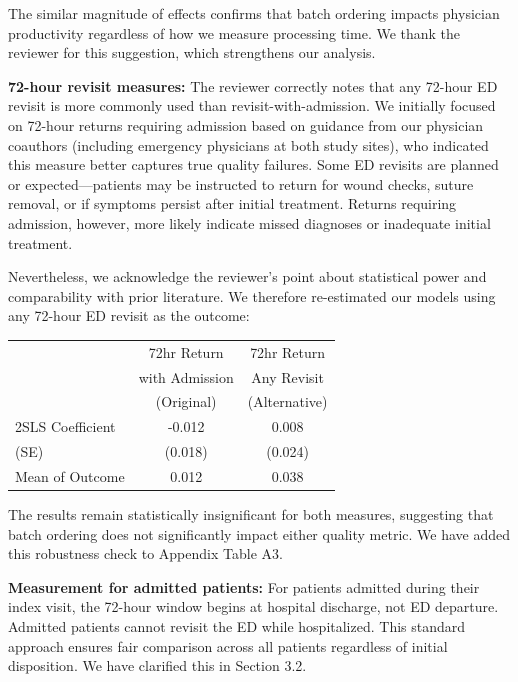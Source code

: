 \documentclass[11pt]{article}
\newcommand{\1}{\hbox{\rm 1\kern-.35em 1}}
\begin{document}
{{{The similar magnitude of effects confirms that batch ordering impacts physician productivity regardless of how we measure processing time. We thank the reviewer for this suggestion, which strengthens our analysis.


\textbf{72-hour revisit measures:} The reviewer correctly notes that any 72-hour ED revisit is more commonly used than revisit-with-admission. We initially focused on 72-hour returns requiring admission based on guidance from our physician coauthors (including emergency physicians at both study sites), who indicated this measure better captures true quality failures. Some ED revisits are planned or expected---patients may be instructed to return for wound checks, suture removal, or if symptoms persist after initial treatment. Returns requiring admission, however, more likely indicate missed diagnoses or inadequate initial treatment.

Nevertheless, we acknowledge the reviewer's point about statistical power and comparability with prior literature. We therefore re-estimated our models using any 72-hour ED revisit as the outcome:

\begin{table}[h]
\centering
\color{blue}
\begin{tabular}{lcc}
\toprule
 & 72hr Return & 72hr Return \\
 & with Admission & Any Revisit \\
 & (Original) & (Alternative) \\
\midrule
2SLS Coefficient & -0.012 & 0.008 \\
(SE) & (0.018) & (0.024) \\
Mean of Outcome & 0.012 & 0.038 \\
\bottomrule
\end{tabular}
\end{table}

The results remain statistically insignificant for both measures, suggesting that batch ordering does not significantly impact either quality metric. We have added this robustness check to Appendix Table A3.

\textbf{Measurement for admitted patients:} For patients admitted during their index visit, the 72-hour window begins at hospital discharge, not ED departure. Admitted patients cannot revisit the ED while hospitalized. This standard approach ensures fair comparison across all patients regardless of initial disposition. We have clarified this in Section 3.2.}

\color{black}

}}
\end{document}
